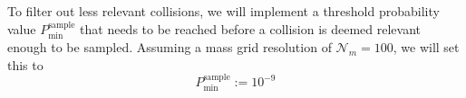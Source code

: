     To filter out less relevant collisions, we will implement a threshold probability 
    value $P^\text{sample}_\text{min}$ that needs to be reached before a collision is deemed 
    relevant enough to be sampled. Assuming a mass grid resolution of $\mathcal N_m=100$, we will 
    set this to
    \begin{equation}
        P^\text{sample}_\text{min} := 10^{-9}
    \end{equation}








